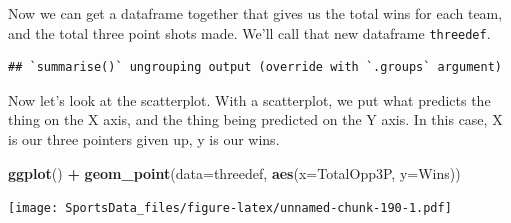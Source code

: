 \documentclass[
]{book}
\newenvironment{Shaded}{\begin{snugshade}}{\end{snugshade}}
\newcommand{\DataTypeTok}[1]{\textcolor[rgb]{0.13,0.29,0.53}{#1}}
\newcommand{\DecValTok}[1]{\textcolor[rgb]{0.00,0.00,0.81}{#1}}
\newcommand{\KeywordTok}[1]{\textcolor[rgb]{0.13,0.29,0.53}{\textbf{#1}}}
\newcommand{\NormalTok}[1]{#1}
\newcommand{\OperatorTok}[1]{\textcolor[rgb]{0.81,0.36,0.00}{\textbf{#1}}}
\newcommand{\StringTok}[1]{\textcolor[rgb]{0.31,0.60,0.02}{#1}}
\begin{document}
\begin{Shaded}
\end{Shaded}

Now we can get a dataframe together that gives us the total wins for each team, and the total three point shots made. We'll call that new dataframe \texttt{threedef}.

\begin{Shaded}
\end{Shaded}

\begin{verbatim}
## `summarise()` ungrouping output (override with `.groups` argument)
\end{verbatim}

Now let's look at the scatterplot. With a scatterplot, we put what predicts the thing on the X axis, and the thing being predicted on the Y axis. In this case, X is our three pointers given up, y is our wins.

\begin{Shaded}
\begin{Highlighting}[]
\KeywordTok{ggplot}\NormalTok{() }\OperatorTok{+}\StringTok{ }\KeywordTok{geom_point}\NormalTok{(}\DataTypeTok{data=}\NormalTok{threedef, }\KeywordTok{aes}\NormalTok{(}\DataTypeTok{x=}\NormalTok{TotalOpp3P, }\DataTypeTok{y=}\NormalTok{Wins))}
\end{Highlighting}
\end{Shaded}

\texttt{[image: SportsData\_files/figure-latex/unnamed-chunk-190-1.pdf]}
\end{document}
